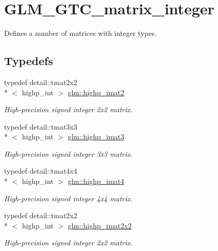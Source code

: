 \hypertarget{group__gtc__matrix__integer}{\section{G\-L\-M\-\_\-\-G\-T\-C\-\_\-matrix\-\_\-integer}
\label{group__gtc__matrix__integer}
}


Defines a number of matrices with integer types.  


\subsection*{Typedefs}
\begin{DoxyCompactItemize}
\item 
typedef detail\-::tmat2x2\\*
$<$ highp\-\_\-int $>$ \hyperlink{group__gtc__matrix__integer_ga83bfb0be8d0a12b7c5e7c4af0eb9f828}{glm\-::highp\-\_\-imat2}
\begin{DoxyCompactList}\small\item\em High-\/precision signed integer 2x2 matrix. \end{DoxyCompactList}\item 
typedef detail\-::tmat3x3\\*
$<$ highp\-\_\-int $>$ \hyperlink{group__gtc__matrix__integer_gab7c4db50bdedef67e45ce7d4ae68e567}{glm\-::highp\-\_\-imat3}
\begin{DoxyCompactList}\small\item\em High-\/precision signed integer 3x3 matrix. \end{DoxyCompactList}\item 
typedef detail\-::tmat4x4\\*
$<$ highp\-\_\-int $>$ \hyperlink{group__gtc__matrix__integer_ga59980867b7f2a7ec595fbb283a555d4c}{glm\-::highp\-\_\-imat4}
\begin{DoxyCompactList}\small\item\em High-\/precision signed integer 4x4 matrix. \end{DoxyCompactList}\item 
typedef detail\-::tmat2x2\\*
$<$ highp\-\_\-int $>$ \hyperlink{group__gtc__matrix__integer_ga5cd1cd0f7e30ec150285e6cf28d75975}{glm\-::highp\-\_\-imat2x2}
\begin{DoxyCompactList}\small\item\em High-\/precision signed integer 2x2 matrix. \end{DoxyCompactList}\item 

\end{DoxyCompactItemize}

